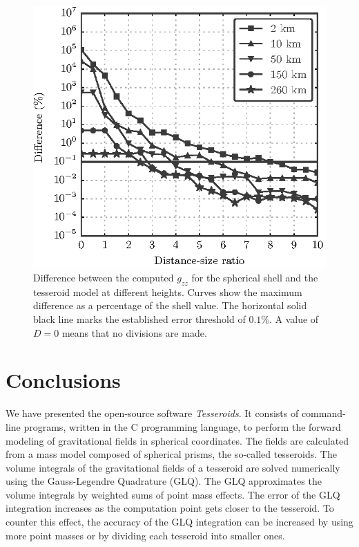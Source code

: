\documentclass[manuscript,endfloat]{geophysics}
\begin{document}
\begin{figure}
    \centering
    \includegraphics{figs/gzz-with-height}
    \caption{
        Difference between the computed $g_{zz}$ for the spherical shell and
        the tesseroid model at different heights. Curves show the maximum
        difference as a percentage of the shell value.
        The horizontal solid black line marks the established error threshold
        of $0.1\%$.
        A value of $D=0$ means that no divisions are made.
    }
    \label{fig:gzz-with-height}
\end{figure}


\section{Conclusions}


We have presented the open-source software \emph{Tesseroids}.
It consists of command-line programs,
written in the C programming language,
to perform the forward modeling of gravitational fields in spherical
coordinates.
The fields are calculated from a mass model composed of spherical prisms, the
so-called tesseroids.
The volume integrals of the gravitational fields of a tesseroid are solved
numerically using the Gauss-Legendre Quadrature (GLQ).
The GLQ approximates the volume integrals by weighted sums of point mass
effects.
The error of the GLQ integration increases as the computation point gets closer
to the tesseroid.
To counter this effect,
the accuracy of the GLQ integration can be increased by using more point
masses or by dividing each tesseroid into smaller ones.
\end{document}
